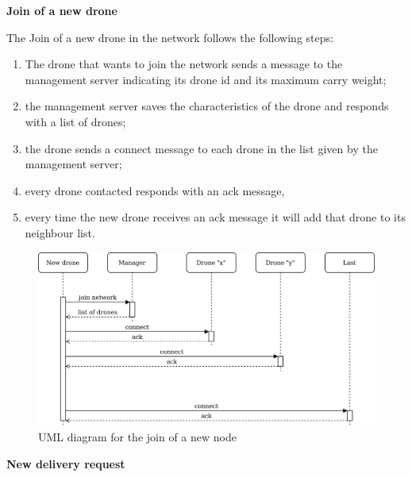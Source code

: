 \documentclass[a4paper, oneside]{memoir}
\begin{document}
\textbf{Join of a new drone}

The Join of a new drone in the network follows the following steps:
\begin{enumerate}
\item  The drone that wants to join the network sends a message to the management server indicating its drone id and its maximum carry weight;
\item the management server saves the characteristics of the drone and responds with a list of drones;
\item the drone sends a connect message to each drone in the list given by the management server;
\item every drone contacted responds with an ack message,
\item every time the new drone receives an ack message it will add that drone to its neighbour list.
\end{enumerate}

\begin{figure}[h!]
	\centering
	\includegraphics[width=\linewidth]{New-drone}
	\caption{UML diagram for the join of a new node }
\end{figure}


\textbf{New delivery request}
\end{document}
